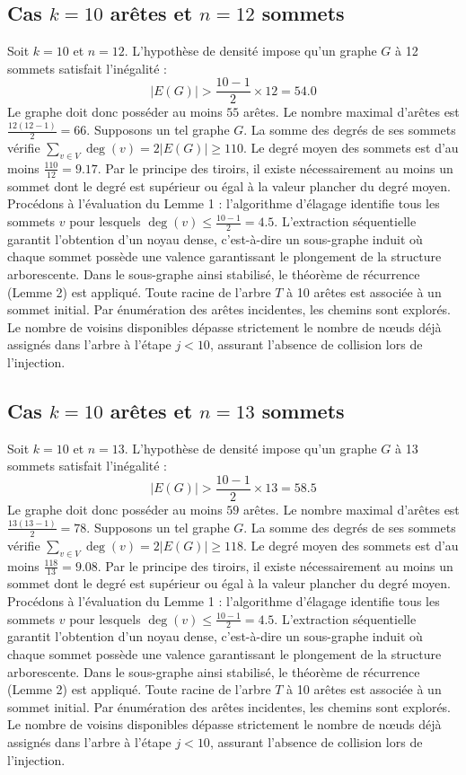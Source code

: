 \documentclass[12pt,a4paper]{article}
\begin{document}
\subsection{Cas $k = 10$ arêtes et $n = 12$ sommets}
Soit $k = 10$ et $n = 12$. L'hypothèse de densité impose qu'un graphe $G$ à 12 sommets satisfait l'inégalité :
$$ |E(G)| > \frac{10-1}{2} \times 12 = 54.0 $$
Le graphe doit donc posséder au moins $55$ arêtes. Le nombre maximal d'arêtes est $\frac{12(12-1)}{2} = 66$.
Supposons un tel graphe $G$. La somme des degrés de ses sommets vérifie $\sum_{v \in V} \deg(v) = 2|E(G)| \geq 110$.
Le degré moyen des sommets est d'au moins $\frac{110}{12} = 9.17$.
Par le principe des tiroirs, il existe nécessairement au moins un sommet dont le degré est supérieur ou égal à la valeur plancher du degré moyen.
Procédons à l'évaluation du Lemme 1 : l'algorithme d'élagage identifie tous les sommets $v$ pour lesquels $\deg(v) \leq \frac{10-1}{2} = 4.5$.
L'extraction séquentielle garantit l'obtention d'un noyau dense, c'est-à-dire un sous-graphe induit où chaque sommet possède une valence garantissant le plongement de la structure arborescente.
Dans le sous-graphe ainsi stabilisé, le théorème de récurrence (Lemme 2) est appliqué. Toute racine de l'arbre $T$ à 10 arêtes est associée à un sommet initial. Par énumération des arêtes incidentes, les chemins sont explorés. Le nombre de voisins disponibles dépasse strictement le nombre de nœuds déjà assignés dans l'arbre à l'étape $j < 10$, assurant l'absence de collision lors de l'injection.

\subsection{Cas $k = 10$ arêtes et $n = 13$ sommets}
Soit $k = 10$ et $n = 13$. L'hypothèse de densité impose qu'un graphe $G$ à 13 sommets satisfait l'inégalité :
$$ |E(G)| > \frac{10-1}{2} \times 13 = 58.5 $$
Le graphe doit donc posséder au moins $59$ arêtes. Le nombre maximal d'arêtes est $\frac{13(13-1)}{2} = 78$.
Supposons un tel graphe $G$. La somme des degrés de ses sommets vérifie $\sum_{v \in V} \deg(v) = 2|E(G)| \geq 118$.
Le degré moyen des sommets est d'au moins $\frac{118}{13} = 9.08$.
Par le principe des tiroirs, il existe nécessairement au moins un sommet dont le degré est supérieur ou égal à la valeur plancher du degré moyen.
Procédons à l'évaluation du Lemme 1 : l'algorithme d'élagage identifie tous les sommets $v$ pour lesquels $\deg(v) \leq \frac{10-1}{2} = 4.5$.
L'extraction séquentielle garantit l'obtention d'un noyau dense, c'est-à-dire un sous-graphe induit où chaque sommet possède une valence garantissant le plongement de la structure arborescente.
Dans le sous-graphe ainsi stabilisé, le théorème de récurrence (Lemme 2) est appliqué. Toute racine de l'arbre $T$ à 10 arêtes est associée à un sommet initial. Par énumération des arêtes incidentes, les chemins sont explorés. Le nombre de voisins disponibles dépasse strictement le nombre de nœuds déjà assignés dans l'arbre à l'étape $j < 10$, assurant l'absence de collision lors de l'injection.
\end{document}
